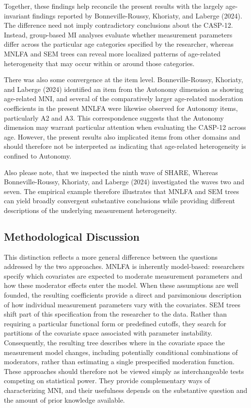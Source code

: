 \documentclass[
  man,
  floatsintext]{apa7}
\begin{document}
Together, these findings help reconcile the present results with the
largely age-invariant findings reported by Bonneville-Roussy, Khoriaty,
and Laberge (2024). The difference need not imply contradictory
conclusions about the CASP-12. Instead, group-based MI analyses evaluate
whether measurement parameters differ across the particular age
categories specified by the researcher, whereas MNLFA and SEM trees can
reveal more localized patterns of age-related heterogeneity that may
occur within or around those categories.

There was also some convergence at the item level. Bonneville-Roussy,
Khoriaty, and Laberge (2024) identified an item from the Autonomy
dimension as showing age-related MNI, and several of the comparatively
larger age-related moderation coefficients in the present MNLFA were
likewise observed for Autonomy items, particularly A2 and A3. This
correspondence suggests that the Autonomy dimension may warrant
particular attention when evaluating the CASP-12 across age. However,
the present results also implicated items from other domains and should
therefore not be interpreted as indicating that age-related
heterogeneity is confined to Autonomy.

Also please note, that we inspected the ninth wave of SHARE, Whereas
Bonneville-Roussy, Khoriaty, and Laberge (2024) investigated the waves
two and seven. The empirical example therefore illustrates that MNLFA
and SEM trees can yield broadly convergent substantive conclusions while
providing different descriptions of the underlying measurement
heterogeneity.

\subsection{Methodological Discussion}\label{methodological-discussion}

This distinction reflects a more general difference between the
questions addressed by the two approaches. MNLFA is inherently
model-based: researchers specify which covariates are expected to
moderate measurement parameters and how these moderator effects enter
the model. When these assumptions are well founded, the resulting
coefficients provide a direct and parsimonious description of how
individual measurement parameters vary with the covariates. SEM trees
shift part of this specification from the researcher to the data. Rather
than requiring a particular functional form or predefined cutoffs, they
search for partitions of the covariate space associated with parameter
instability. Consequently, the resulting tree describes where in the
covariate space the measurement model changes, including potentially
conditional combinations of moderators, rather than estimating a single
prespecified moderation function. These approaches should therefore not
be viewed simply as interchangeable tests competing on statistical
power. They provide complementary ways of characterizing MNI, and their
usefulness depends on the substantive question and the amount of prior
knowledge available.
\end{document}
